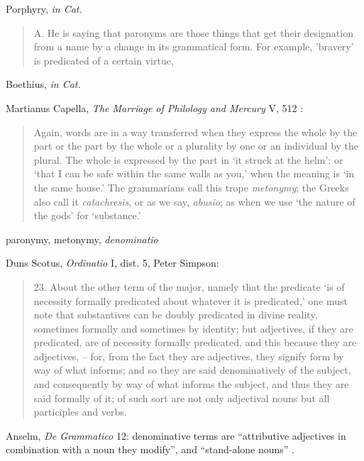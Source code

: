 \documentclass{article}
\begin{document}
Porphyry, {\em in Cat.}
\begin{quote}
A. He is saying that paronyms are those things that get their designation from a name by a change in its grammatical form. For example, 'bravery' is predicated of a certain virtue,\end{quote}



Boethius, {\em in Cat.}


Martianus Capella, {\em The Marriage of Philology and Mercury} V, 512 \cite[p.~191]{capellaII}:

\begin{quote}
Again, words are in a way transferred when
they express the whole by the part or the part by the whole or a 
plurality by one or an individual by the plural. The whole is expressed
by the part in `it struck at the helm'; or `that I can be
safe within the same walls as you,' when the meaning is `in the same
house.' The grammarians call this trope {\em metonymy}; the Greeks also
call it {\em catachresis}, or as we say, {\em abusio}; as when we use `the nature
of the gods' for `substance.' 
\end{quote}

paronymy, metonymy, {\em denominatio}

Duns Scotus, {\em Ordinatio} I, dist. 5, Peter Simpson:

\begin{quote}
23. About the other term of the major, namely that the predicate `is of necessity formally predicated about whatever it is predicated,' one must note that substantives can be doubly predicated in divine reality, sometimes formally and sometimes by identity; but adjectives, if they are predicated, are of necessity formally predicated, and this because they are adjectives, -- for, from the fact they are adjectives, they signify form by way of what informs; and so they are said denominatively of the subject, and consequently by way of what informs the subject, and thus they are said formally of it; of such sort are not only adjectival nouns but all participles and verbs.
\end{quote}

Anselm, {\em De Grammatico} 12: denominative terms are ``attributive adjectives in combination with a noun
they modify'', and ``stand-alone nouns'' \cite{anselm}.
\end{document}
